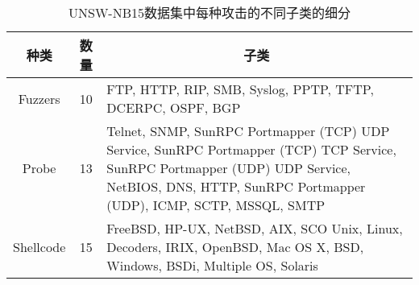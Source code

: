 \begin{table}[htbp]
	\caption{UNSW-NB15数据集中每种攻击的不同子类的细分}
	\label{tab:UNSW-NB15_class}
	\begin{tabularx}{\textwidth}{@{}ccX@{}}
		\toprule
		\multicolumn{1}{c}{\textbf{种类}} & \multicolumn{1}{c}{\textbf{数量}} & \multicolumn{1}{c}{\textbf{子类}}                                                                                                                                                                                                                                                                                                                                                                                                                                                                                                                                   \\
		\midrule
		Fuzzers                           & 10                                & FTP, HTTP, RIP, SMB, Syslog, PPTP, TFTP, DCERPC, OSPF, BGP                                                                                                                                                                                                                                                                                                                                                                                                                                                                                                          \\
		Probe                             & 13                                & Telnet, SNMP, SunRPC Portmapper (TCP) UDP Service, SunRPC Portmapper (TCP) TCP Service, SunRPC Portmapper (UDP) UDP Service, NetBIOS, DNS, HTTP,
		SunRPC Portmapper (UDP), ICMP, SCTP, MSSQL, SMTP                                                                                                                                                                                                                                                                                                                                                                                                                                                                                                                                                                                            \\
		Shellcode                         & 15                                & FreeBSD, HP-UX, NetBSD, AIX, SCO Unix, Linux, Decoders, IRIX, OpenBSD, Mac OS X, BSD, Windows, BSDi, Multiple OS, Solaris                                                                                                                                                                                                                                                                                                                                                                                                                                           \\

\end{tabularx}
\end{table}

